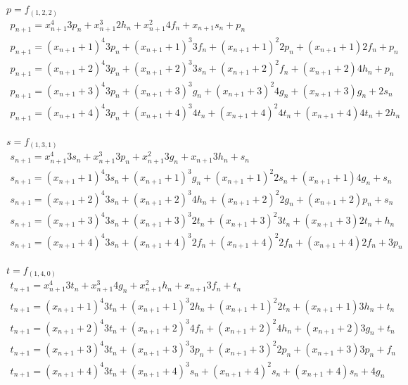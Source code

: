 \documentclass[a4paper, 14pt]{extarticle}
\begin{document}
$p=f_{(1,2,2)}$
$$
\begin{array}{l}
p_{n+1} = x_{n+1}^{4}3p_{n} + x_{n+1}^{3}2h_{n} + x_{n+1}^{2}4f_{n} + x_{n+1}s_{n} + p_{n} \\
p_{n+1} = (x_{n+1}+1)^{4}3p_{n} + (x_{n+1}+1)^{3}3f_{n} + (x_{n+1}+1)^{2}2p_{n} + (x_{n+1}+1)2f_{n} + p_{n} \\
p_{n+1} = (x_{n+1}+2)^{4}3p_{n} + (x_{n+1}+2)^{3}3s_{n} + (x_{n+1}+2)^{2}f_{n} + (x_{n+1}+2)4h_{n} + p_{n} \\
p_{n+1} = (x_{n+1}+3)^{4}3p_{n} + (x_{n+1}+3)^{3}g_{n} + (x_{n+1}+3)^{2}4g_{n} + (x_{n+1}+3)g_{n} + 2s_{n} \\
p_{n+1} = (x_{n+1}+4)^{4}3p_{n} + (x_{n+1}+4)^{3}4t_{n} + (x_{n+1}+4)^{2}4t_{n} + (x_{n+1}+4)4t_{n} + 2h_{n} \\
\end{array}
$$

$s=f_{(1,3,1)}$
$$
\begin{array}{l}
s_{n+1} = x_{n+1}^{4}3s_{n} + x_{n+1}^{3}3p_{n} + x_{n+1}^{2}3g_{n} + x_{n+1}3h_{n} + s_{n} \\
s_{n+1} = (x_{n+1}+1)^{4}3s_{n} + (x_{n+1}+1)^{3}g_{n} + (x_{n+1}+1)^{2}2s_{n} + (x_{n+1}+1)4g_{n} + s_{n} \\
s_{n+1} = (x_{n+1}+2)^{4}3s_{n} + (x_{n+1}+2)^{3}4h_{n} + (x_{n+1}+2)^{2}2g_{n} + (x_{n+1}+2)p_{n} + s_{n} \\
s_{n+1} = (x_{n+1}+3)^{4}3s_{n} + (x_{n+1}+3)^{3}2t_{n} + (x_{n+1}+3)^{2}3t_{n} + (x_{n+1}+3)2t_{n} + h_{n} \\
s_{n+1} = (x_{n+1}+4)^{4}3s_{n} + (x_{n+1}+4)^{3}2f_{n} + (x_{n+1}+4)^{2}2f_{n} + (x_{n+1}+4)2f_{n} + 3p_{n} \\
\end{array}
$$

$t=f_{(1,4,0)}$
$$
\begin{array}{l}
t_{n+1} = x_{n+1}^{4}3t_{n} + x_{n+1}^{3}4g_{n} + x_{n+1}^{2}h_{n} + x_{n+1}3f_{n} + t_{n} \\
t_{n+1} = (x_{n+1}+1)^{4}3t_{n} + (x_{n+1}+1)^{3}2h_{n} + (x_{n+1}+1)^{2}2t_{n} + (x_{n+1}+1)3h_{n} + t_{n} \\
t_{n+1} = (x_{n+1}+2)^{4}3t_{n} + (x_{n+1}+2)^{3}4f_{n} + (x_{n+1}+2)^{2}4h_{n} + (x_{n+1}+2)3g_{n} + t_{n} \\
t_{n+1} = (x_{n+1}+3)^{4}3t_{n} + (x_{n+1}+3)^{3}3p_{n} + (x_{n+1}+3)^{2}2p_{n} + (x_{n+1}+3)3p_{n} + f_{n} \\
t_{n+1} = (x_{n+1}+4)^{4}3t_{n} + (x_{n+1}+4)^{3}s_{n} + (x_{n+1}+4)^{2}s_{n} + (x_{n+1}+4)s_{n} + 4g_{n} \\
\end{array}
$$
\end{document}
